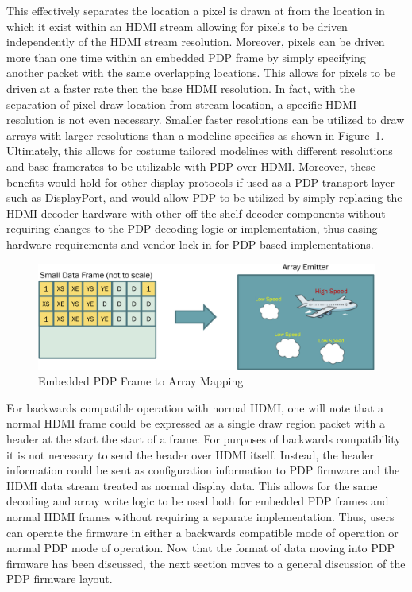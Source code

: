     This effectively separates the location a pixel is drawn at from the location in which it exist within an HDMI stream allowing for pixels to be driven independently of the HDMI stream resolution. Moreover, pixels can be driven more than one time within an embedded PDP frame by simply specifying another packet with the same overlapping locations. This allows for pixels to be driven at a faster rate then the base HDMI resolution. In fact, with the separation of pixel draw location from stream location, a specific HDMI resolution is not even necessary. Smaller faster resolutions can be utilized to draw arrays with larger resolutions than a modeline specifies as shown in Figure~\ref{fig:embedded_frame_to_emitter}. Ultimately, this allows for costume tailored modelines with different resolutions and base framerates to be utilizable with PDP over HDMI. Moreover, these benefits would hold for other display protocols if used as a PDP transport layer such as DisplayPort, and would allow PDP to be utilized by simply replacing the HDMI decoder hardware with other off the shelf decoder components without requiring changes to the PDP decoding logic or implementation, thus easing hardware requirements and vendor lock-in for PDP based implementations.

    \begin{figure}
        \centering
        \includegraphics[width=1.0\textwidth]{fig/embedded_frame_to_emitter.pdf}
        \caption{Embedded PDP Frame to Array Mapping}
        \label{fig:embedded_frame_to_emitter}
    \end{figure}

    For backwards compatible operation with normal HDMI, one will note that a normal HDMI frame could be expressed as a single draw region packet with a header at the start the start of a frame. For purposes of backwards compatibility it is not necessary to send the header over HDMI itself. Instead, the header information could be sent as configuration information to PDP firmware and the HDMI data stream treated as normal display data. This allows for the same decoding and array write logic to be used both for embedded PDP frames and normal HDMI frames without requiring a separate implementation. Thus, users can operate the firmware in either a backwards compatible mode of operation or normal PDP mode of operation. Now that the format of data moving into PDP firmware has been discussed, the next section moves to a general discussion of the PDP firmware layout.

